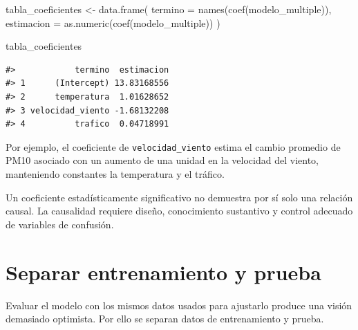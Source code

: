 \documentclass[
  spanish,
  10.5pt,
  letterpaper,
  openany,
  headings=big]{scrbook}
\newenvironment{Shaded}{}{}
\newcommand{\AttributeTok}[1]{\textcolor[rgb]{0.84,0.23,0.29}{#1}}
\newcommand{\FunctionTok}[1]{\textcolor[rgb]{0.44,0.26,0.76}{#1}}
\newcommand{\NormalTok}[1]{\textcolor[rgb]{0.14,0.16,0.18}{#1}}
\newcommand{\OtherTok}[1]{\textcolor[rgb]{0.44,0.26,0.76}{#1}}
\begin{document}
\begin{Shaded}
\begin{Highlighting}[]
\NormalTok{tabla\_coeficientes }\OtherTok{\textless{}{-}} \FunctionTok{data.frame}\NormalTok{(}
  \AttributeTok{termino =} \FunctionTok{names}\NormalTok{(}\FunctionTok{coef}\NormalTok{(modelo\_multiple)),}
  \AttributeTok{estimacion =} \FunctionTok{as.numeric}\NormalTok{(}\FunctionTok{coef}\NormalTok{(modelo\_multiple))}
\NormalTok{)}

\NormalTok{tabla\_coeficientes}
\end{Highlighting}
\end{Shaded}

\begin{verbatim}
#>            termino  estimacion
#> 1      (Intercept) 13.83168556
#> 2      temperatura  1.01628652
#> 3 velocidad_viento -1.68132208
#> 4          trafico  0.04718991
\end{verbatim}

Por ejemplo, el coeficiente de \texttt{velocidad\_viento} estima el
cambio promedio de PM10 asociado con un aumento de una unidad en la
velocidad del viento, manteniendo constantes la temperatura y el
tráfico.

\begin{tcolorbox}[enhanced jigsaw, arc=.35mm, bottomrule=.15mm, bottomtitle=1mm, breakable, colback=white, colbacktitle=quarto-callout-warning-color!10!white, colframe=quarto-callout-warning-color-frame, coltitle=black, left=2mm, leftrule=.75mm, opacityback=0, opacitybacktitle=0.6, rightrule=.15mm, title=\textcolor{quarto-callout-warning-color}{\faExclamationTriangle}\hspace{0.5em}{Asociación no significa causalidad}, titlerule=0mm, toprule=.15mm, toptitle=1mm]

Un coeficiente estadísticamente significativo no demuestra por sí solo
una relación causal. La causalidad requiere diseño, conocimiento
sustantivo y control adecuado de variables de confusión.

\end{tcolorbox}

\section{Separar entrenamiento y
prueba}\label{separar-entrenamiento-y-prueba}

Evaluar el modelo con los mismos datos usados para ajustarlo produce una
visión demasiado optimista. Por ello se separan datos de entrenamiento y
prueba.
\end{document}
